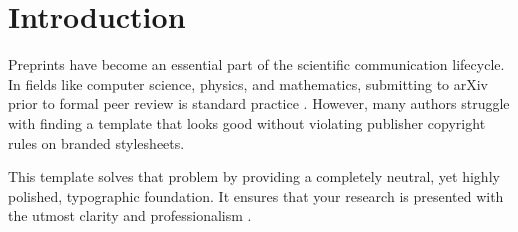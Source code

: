 \section{Introduction}
Preprints have become an essential part of the scientific communication lifecycle. In fields like computer science, physics, and mathematics, submitting to arXiv prior to formal peer review is standard practice \cite{lecun2015deep}. However, many authors struggle with finding a template that looks good without violating publisher copyright rules on branded stylesheets.

This template solves that problem by providing a completely neutral, yet highly polished, typographic foundation. It ensures that your research is presented with the utmost clarity and professionalism \cite{silver2016mastering}.
